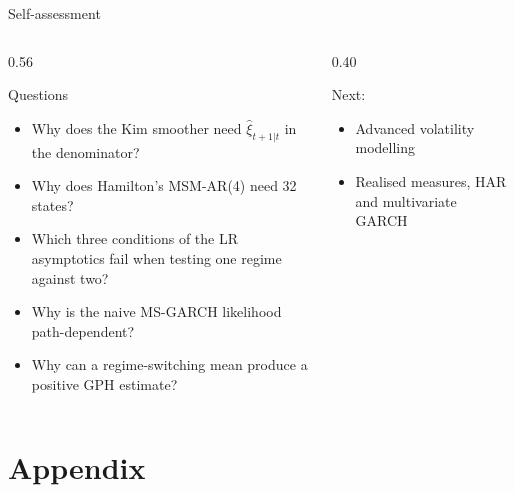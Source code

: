 \begin{frame}{Self-assessment}
\itemsize{\small}
\begin{columns}[T]
\begin{column}{0.56\textwidth}
\begin{block}{Questions}
\begin{itemize}
    \item Why does the Kim smoother need $\hat\xi_{t+1|t}$ in the denominator?
    \item Why does Hamilton's MSM-AR(4) need 32 states?
    \item Which three conditions of the LR asymptotics fail when testing one regime against two?
    \item Why is the naive MS-GARCH likelihood path-dependent?
    \item Why can a regime-switching mean produce a positive GPH estimate?
\end{itemize}
\end{block}
\end{column}
\begin{column}{0.40\textwidth}
\begin{block}{Next: }
\begin{itemize}
    \item Advanced volatility modelling
    \item Realised measures, HAR and multivariate GARCH
\end{itemize}
\end{block}
\end{column}
\end{columns}
\end{frame}


\section{Appendix}

